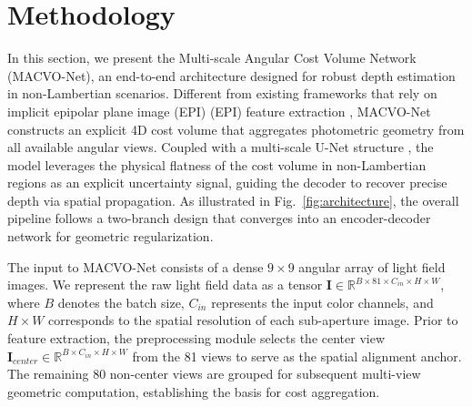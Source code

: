 \documentclass[lettersize,journal]{IEEEtran}
\begin{document}
\section{Methodology}

In this section, we present the Multi-scale Angular Cost Volume Network (MACVO-Net), an end-to-end architecture designed for robust depth estimation in non-Lambertian scenarios. Different from existing frameworks that rely on implicit epipolar plane image (EPI) (EPI) feature extraction \cite{wanner2014, heber2018}, MACVO-Net constructs an explicit 4D cost volume that aggregates photometric geometry from all available angular views. Coupled with a multi-scale U-Net structure \cite{ronneberger2015}, the model leverages the physical flatness of the cost volume in non-Lambertian regions as an explicit uncertainty signal, guiding the decoder to recover precise depth via spatial propagation. As illustrated in Fig.~\ref{fig:architecture}, the overall pipeline follows a two-branch design that converges into an encoder-decoder network for geometric regularization.

The input to MACVO-Net consists of a dense $9 \times 9$ angular array of light field images. We represent the raw light field data as a tensor $\mathbf{I} \in \mathbb{R}^{B \times 81 \times C_{in} \times H \times W}$, where $B$ denotes the batch size, $C_{in}$ represents the input color channels, and $H \times W$ corresponds to the spatial resolution of each sub-aperture image. Prior to feature extraction, the preprocessing module selects the center view $\mathbf{I}_{center} \in \mathbb{R}^{B \times C_{in} \times H \times W}$ from the 81 views to serve as the spatial alignment anchor. The remaining 80 non-center views are grouped for subsequent multi-view geometric computation, establishing the basis for cost aggregation.
\end{document}
